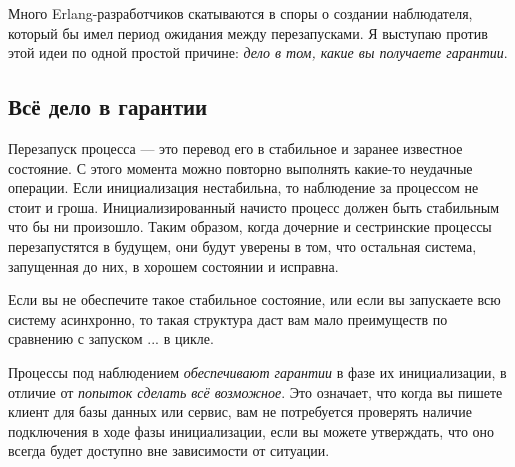 \documentclass[11pt, oneside]{book}   	%
\begin{document}
Много Erlang-разработчиков скатываются в споры о создании наблюдателя, который бы имел период ожидания между перезапусками. Я выступаю против этой идеи по одной простой причине: \emph{дело в том, какие вы получаете гарантии}.

\subsection{Всё дело в гарантии}
\label{subsec:start-link-guarantees}

Перезапуск процесса --- это перевод его в стабильное и заранее известное состояние. С этого момента можно повторно выполнять какие-то неудачные операции. Если инициализация нестабильна, то наблюдение за процессом не стоит и гроша. Инициализированный начисто процесс должен быть стабильным что бы ни произошло. Таким образом, когда дочерние и сестринские процессы перезапустятся в будущем, они будут уверены в том, что остальная система, запущенная до них, в хорошем состоянии и исправна.

Если вы не обеспечите такое стабильное состояние, или если вы запускаете всю систему асинхронно, то такая структура даст вам мало преимуществ по сравнению с запуском  ...  в цикле.

Процессы под наблюдением \emph{обеспечивают гарантии} в фазе их инициализации, в отличие от \emph{попыток сделать всё возможное}. Это означает, что когда вы пишете клиент для базы данных или сервис, вам не потребуется проверять наличие подключения в ходе фазы инициализации, если вы можете утверждать, что оно всегда будет доступно вне зависимости от ситуации.
\end{document}
